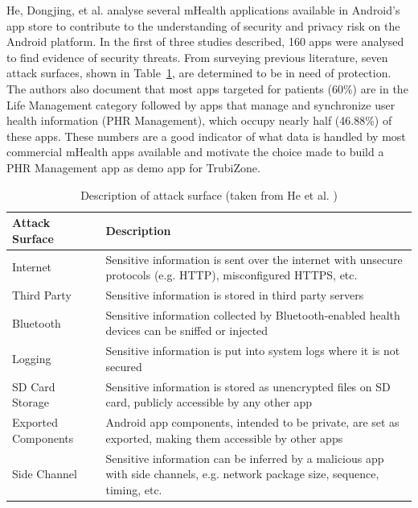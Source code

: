 He, Dongjing, et al. \cite{he2014security} analyse several mHealth applications available in Android's app store to contribute to the understanding of security and privacy risk on the Android platform. In the first of three studies described, 160 apps were analysed to find evidence of security threats. From surveying previous literature, seven attack surfaces, shown in Table~\ref{tab:attacksurfaces}, are determined to be in need of protection.
The authors also document that most apps targeted for patients (60\%) are in the Life Management category followed by apps that manage and synchronize user health information (\ac{PHR} Management), which occupy nearly half (46.88\%) of these apps. These numbers are a good indicator of what data is handled by most commercial mHealth apps available and motivate the choice made to build a \ac{PHR} Management app as demo app for TrubiZone.

\begin{table}[t]
	\caption {Description of attack surface (taken from He et al. \cite{he2014security})}
	\label{tab:attacksurfaces}
	\begin{tabular}{|>{\raggedright}p{2cm}|>{\raggedright\arraybackslash}p{10cm}|}
		\hline
		\textbf{Attack Surface}      & \textbf{Description}                                                                                                                    \\ \hline
		Internet            & Sensitive information is sent over the internet with unsecure protocols (e.g. HTTP), misconfigured HTTPS, etc.                 \\ \hline
		Third Party         & Sensitive information is stored in third party servers                                                                         \\ \hline
		Bluetooth           & Sensitive information collected by Bluetooth-enabled health devices can be sniffed or injected                                 \\ \hline
		Logging             & Sensitive information is put into system logs where it is not secured                                                          \\ \hline
		SD Card Storage     & Sensitive information is stored as unencrypted files on SD card, publicly accessible by any other app                          \\ \hline
		Exported Components &  Android app components, intended to be private, are set as exported, making them accessible by other apps                     \\ \hline
		Side Channel        & Sensitive information can be inferred by a malicious app with side channels, e.g. network package size, sequence, timing, etc. \\ \hline
	\end{tabular}
\end{table}

